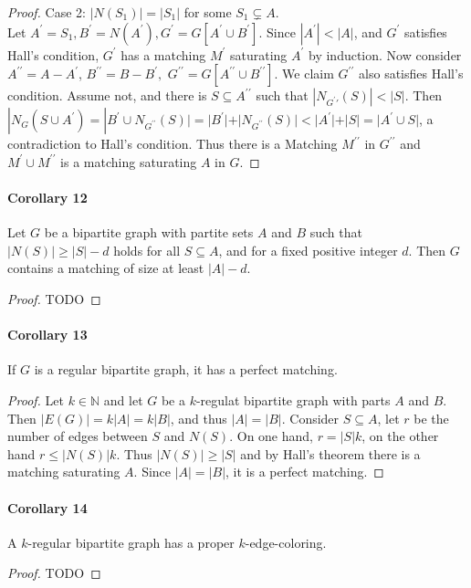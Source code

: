 \begin{proof}
   \bigskip \noindent
   Case 2: $|N(S_1)| = |S_1| $ for some $ S_1 \subsetneq A$. \\
   Let $ A^\prime = S_1, B^\prime = N(A^\prime), G^\prime 
   = G[A^\prime \cup B^\prime].$ Since $ |A^\prime| < |A|$, and 
   $ G^\prime $ satisfies Hall's condition, $ G^\prime $ has a 
   matching $ M^\prime $ saturating $ A^\prime $ by induction.
   Now consider $ A^{\prime\prime} = A - A^\prime $, $ B^{\prime\prime} = B - B^\prime,$
   $ G^{\prime\prime} = G[A^{\prime\prime} \cup B^{\prime\prime}] $.
   We claim $ G^{\prime\prime} $ also satisfies Hall's condition.
   Assume not, and there is $ S \subseteq A^{\prime\prime} $ such that 
   $ |N_{G^\prime\prime}(S)| < |S|$. Then $ |N_G(S \cup A^\prime) = 
   |B^\prime \cup N_{G^{\prime\prime}}(S)| = |B^\prime| + |N_{G^{\prime\prime}}(S)|
   < |A^\prime| + |S| = |A^\prime \cup S|$, a contradiction to Hall's condition.
   Thus there is a Matching $ M^{\prime\prime} $ in $ G^{\prime\prime} $ and 
   $ M^\prime \cup M^{\prime\prime} $ is a matching saturating $ A $ in $ G $.
\end{proof}

\paragraph{Corollary 12} Let $ G $ be a bipartite graph with partite sets $ A $ and 
$ B $ such that $ |N(S)| \geq |S| - d $ holds for all $ S \subseteq A$, and for a 
fixed positive integer $ d$. Then $ G $ contains a matching of size at least 
$ |A| - d$.
\begin{proof}
   TODO 
\end{proof}

\paragraph{Corollary 13} If $ G $ is a regular bipartite graph, it has a perfect 
matching.
\begin{proof}
   Let $ k \in \mathbb{N} $ and let $ G $ be a $k$-regulat bipartite graph with 
   parts $ A $ and $ B $. Then $ |E(G)| = k|A| = k|B|$, and thus $ |A| = |B|$.
   Consider $ S \subseteq A $, let $ r $ be the number of edges between 
   $ S $ and $ N(S)$. On one hand, $ r = |S|k $, on the other hand 
   $ r \leq |N(S)|k$. Thus $ |N(S)| \geq |S| $ and by Hall's theorem there is a 
   matching saturating $ A$. Since $ |A| = |B| $, it is a perfect matching.
\end{proof}

\paragraph{Corollary 14} A $k$-regular bipartite graph has a proper $k$-edge-coloring.
\begin{proof}
   TODO
\end{proof}


